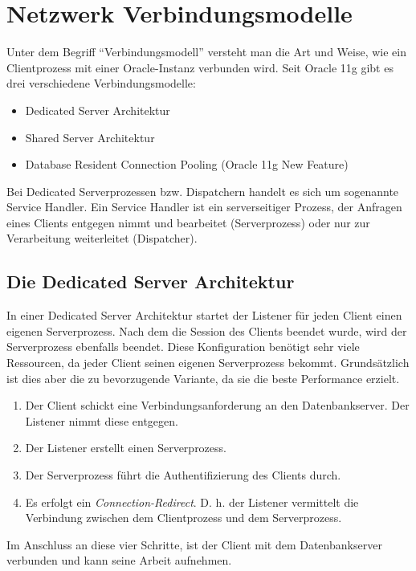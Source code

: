     \section{Netzwerk Verbindungsmodelle}
    \label{connectionmodels}
      Unter dem Begriff \enquote{Verbindungsmodell} versteht man die Art und Weise, wie ein Clientprozess mit einer Oracle-Instanz verbunden wird. Seit Oracle 11g gibt es drei verschiedene Verbindungsmodelle:

      \begin{itemize}
        \item Dedicated Server Architektur
        \item Shared Server Architektur
        \item Database Resident Connection Pooling (Oracle 11g New Feature)
      \end{itemize}

      \begin{merke}
        Bei Dedicated Serverprozessen bzw. Dispatchern handelt es sich um sogenannte Service Handler. Ein Service Handler ist ein serverseitiger Prozess, der Anfragen eines Clients entgegen nimmt und bearbeitet (Serverprozess) oder nur zur Verarbeitung weiterleitet (Dispatcher).
      \end{merke}
      \subsection{Die Dedicated Server Architektur}
        In einer Dedicated Server Architektur startet der Listener f\"ur jeden Client einen eigenen Serverprozess. Nach dem die Session des Clients beendet wurde, wird der Serverprozess ebenfalls beendet. Diese Konfiguration ben\"otigt sehr viele Ressourcen, da jeder Client seinen eigenen Serverprozess bekommt. Grunds\"atzlich ist dies aber die zu bevorzugende Variante, da sie die beste Performance erzielt.
        \begin{enumerate}
          \item Der Client schickt eine Verbindungsanforderung an den Datenbankserver. Der Listener nimmt diese entgegen.
          \item Der Listener erstellt einen Serverprozess.
          \item Der Serverprozess f\"uhrt die Authentifizierung des Clients durch.
          \item Es erfolgt ein \textit{Connection-Redirect}. D. h. der Listener vermittelt die Verbindung zwischen dem Clientprozess und dem Serverprozess.
        \end{enumerate}
        Im Anschluss an diese vier Schritte, ist der Client mit dem Datenbankserver verbunden und kann seine Arbeit aufnehmen.
